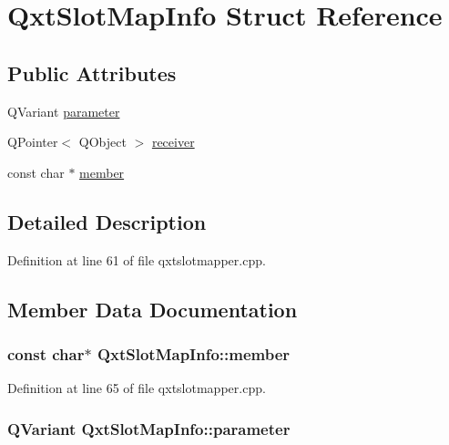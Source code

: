 \hypertarget{struct_qxt_slot_map_info}{\section{Qxt\-Slot\-Map\-Info Struct Reference}
\label{struct_qxt_slot_map_info}
}
\subsection*{Public Attributes}
\begin{DoxyCompactItemize}
\item 
Q\-Variant \hyperlink{struct_qxt_slot_map_info_a62169494f3a01cc374c922fd35fc2851}{parameter}
\item 
Q\-Pointer$<$ Q\-Object $>$ \hyperlink{struct_qxt_slot_map_info_a4c93e0778f262f8a350e46a310d9f3c3}{receiver}
\item 
const char $\ast$ \hyperlink{struct_qxt_slot_map_info_a2fea99d81c12e70a9bb171f5818bc5ba}{member}
\end{DoxyCompactItemize}


\subsection{Detailed Description}


Definition at line 61 of file qxtslotmapper.\-cpp.



\subsection{Member Data Documentation}
\hypertarget{struct_qxt_slot_map_info_a2fea99d81c12e70a9bb171f5818bc5ba}{
\subsubsection[{member}]{\setlength{\rightskip}{0pt plus 5cm}const char$\ast$ Qxt\-Slot\-Map\-Info\-::member}}\label{struct_qxt_slot_map_info_a2fea99d81c12e70a9bb171f5818bc5ba}


Definition at line 65 of file qxtslotmapper.\-cpp.

\hypertarget{struct_qxt_slot_map_info_a62169494f3a01cc374c922fd35fc2851}{
\subsubsection[{parameter}]{\setlength{\rightskip}{0pt plus 5cm}Q\-Variant Qxt\-Slot\-Map\-Info\-::parameter}}\label{struct_qxt_slot_map_info_a62169494f3a01cc374c922fd35fc2851}


